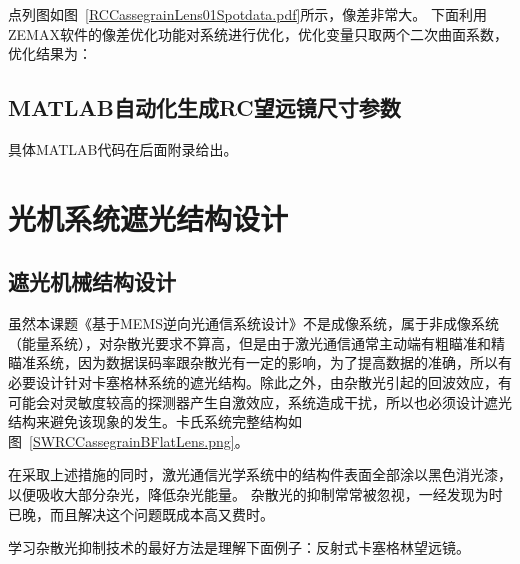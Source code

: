 

点列图如图~\ref{RCCassegrainLens01Spotdata.pdf}所示，像差非常大。
下面利用ZEMAX软件的像差优化功能对系统进行优化，优化变量只取两个二次曲面系数，优化结果为：


\subsection{MATLAB自动化生成RC望远镜尺寸参数}

具体MATLAB代码在后面附录给出。

\section{光机系统遮光结构设计}
 
\subsection{遮光机械结构设计}
虽然本课题《基于MEMS逆向光通信系统设计》不是成像系统，属于非成像系统（能量系统），对杂散光要求不算高，但是由于激光通信通常主动端有粗瞄准和精瞄准系统，因为数据误码率跟杂散光有一定的影响，为了提高数据的准确，所以有必要设计针对卡塞格林系统的遮光结构。除此之外，由杂散光引起的回波效应，有可能会对灵敏度较高的探测器产生自激效应，系统造成干扰，所以也必须设计遮光结构来避免该现象的发生。卡氏系统完整结构如图~\ref{SWRCCassegrainBFlatLens.png}。

在采取上述措施的同时，激光通信光学系统中的结构件表面全部涂以黑色消光漆，以便吸收大部分杂光，降低杂光能量。
杂散光的抑制常常被忽视，一经发现为时已晚，而且解决这个问题既成本高又费时。

学习杂散光抑制技术的最好方法是理解下面例子：反射式卡塞格林望远镜。

